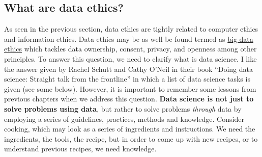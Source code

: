 \documentclass[
]{book}
\begin{document}
\hypertarget{what-are-data-ethics}{%
\subsection{What are data ethics?}\label{what-are-data-ethics}}

As seen in the previous section, data ethics are tightly related to computer ethics and information ethics. Data ethics may be as well be found termed as \href{https://en.wikipedia.org/wiki/Big_data_ethics}{big data ethics} which tackles data ownership, consent, privacy, and openness among other principles. To answer this question, we need to clarify what is data science. I like the answer given by Rachel Schutt and Cathy O'Neil in their book ``Doing data science: Straight talk from the frontline'' \citep{o2013doing} in which a list of data science tasks is given (see some below). However, it is important to remember some lessons from previous chapters when we address this question. \textbf{Data science is not just to solve problems using data}, but rather to solve problems \emph{through} data by employing a series of guidelines, practices, methods and knowledge. Consider cooking, which may look as a series of ingredients and instructions. We need the ingredients, the tools, the recipe, but in order to come up with new recipes, or to understand previous recipes, we need knowledge.
\end{document}
